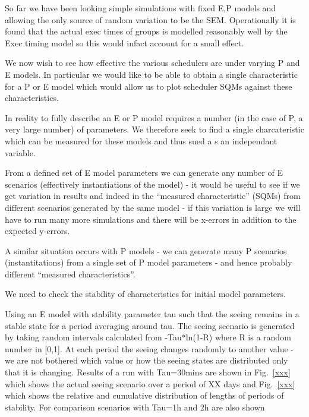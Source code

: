 So far we have been looking simple simulations with fixed E,P models and allowing the only source of random variation to be the SEM. Operationally it is found that the actual exec times of groups is modelled reasonably well by the Exec timing model so this would infact account for a small effect.

We now wish to see how effective the various schedulers are under varying P and E models. In particular we would like to be able to obtain a single characteristic for a P or E model which would allow us to plot scheduler  SQMs against these characteristics.

In reality to fully describe an E or P model requires a number (in the case of P, a very large number) of parameters. We therefore seek to find a single charcateristic which can be measured for these models and thus sued a s an independant variable.

From a defined set of E model parameters we can generate any number of E scenarios (effectively instantiations of the model) - it would be useful to see if we get variation in results and indeed in the ``measured characteristic'' (SQMs) from different scenarios generated by the same model - if this variation is large we will have to run many more simulations and there will be x-errors in addition to the expected y-errors.

A similar situation occurs with P models - we can generate many P scenarios (instantitations) from a single set of P model parameters - and hence probably different ``measured characteristics''.

We need to check the stability of characteristics for initial model parameters.

Using an E model with stability parameter tau such that the seeing remains in a stable state for a period averaging around tau. The seeing scenario is generated by taking random intervals calculated from -Tau*ln(1-R) where R is a random number in [0,1]. At each period the seeing changes randomly to another value - we are not bothered which value or how the seeing states are distributed only that it is changing. Results of a run with Tau=30mins are shown in Fig.~\ref{xxx} which shows the actual seeing scenario over a period of XX days and Fig.~\ref{xxx} which shows the relative and cumulative distribution of lengths of periods of stability. For comparison scenarios with Tau=1h and 2h are also shown